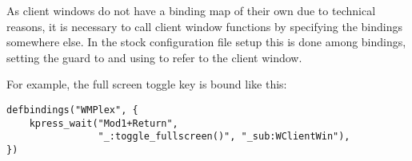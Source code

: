 As client windows do not have a binding map of their own due to technical
reasons, it is necessary to call client window functions by specifying the
bindings somewhere else. In the stock configuration file setup this is done
among  bindings, setting the guard to 
and using  to refer to the client window.

For example, the full screen toggle key is bound like this:

\begin{verbatim}
defbindings("WMPlex", {
    kpress_wait("Mod1+Return", 
                "_:toggle_fullscreen()", "_sub:WClientWin"),
})    
\end{verbatim}



